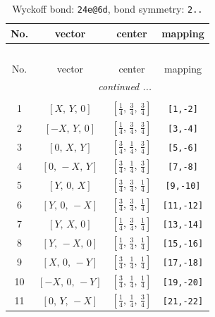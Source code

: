 \documentclass[fleqn,8pt]{jsarticle}
\begin{document}
\begin{longtable}{cccc}
\caption{Wyckoff bond: {\tt 24e@6d}, bond symmetry: {\tt 2..}}
 \\
 \hline \hline
No. & vector & center & mapping \\ \hline \endfirsthead

\multicolumn{3}{l}{\tablename\ \thetable{}} \\
 \hline \hline
No. & vector & center & mapping \\ \hline \endhead

 \hline \hline
\multicolumn{3}{r}{\footnotesize\it continued ...} \\ \endfoot

 \hline \hline
\multicolumn{3}{r}{} \\ \endlastfoot

1 & $\left[ X,\, Y,\, 0 \right]$ & $\left[ \frac{1}{4},\, \frac{3}{4},\, \frac{3}{4} \right]$ & {\tt [1,-2]} \\ \hline
2 & $\left[ - X,\, Y,\, 0 \right]$ & $\left[ \frac{1}{4},\, \frac{3}{4},\, \frac{3}{4} \right]$ & {\tt [3,-4]} \\ \hline
3 & $\left[ 0,\, X,\, Y \right]$ & $\left[ \frac{3}{4},\, \frac{1}{4},\, \frac{3}{4} \right]$ & {\tt [5,-6]} \\ \hline
4 & $\left[ 0,\, - X,\, Y \right]$ & $\left[ \frac{3}{4},\, \frac{1}{4},\, \frac{3}{4} \right]$ & {\tt [7,-8]} \\ \hline
5 & $\left[ Y,\, 0,\, X \right]$ & $\left[ \frac{3}{4},\, \frac{3}{4},\, \frac{1}{4} \right]$ & {\tt [9,-10]} \\ \hline
6 & $\left[ Y,\, 0,\, - X \right]$ & $\left[ \frac{3}{4},\, \frac{3}{4},\, \frac{1}{4} \right]$ & {\tt [11,-12]} \\ \hline
7 & $\left[ Y,\, X,\, 0 \right]$ & $\left[ \frac{1}{4},\, \frac{3}{4},\, \frac{1}{4} \right]$ & {\tt [13,-14]} \\ \hline
8 & $\left[ Y,\, - X,\, 0 \right]$ & $\left[ \frac{1}{4},\, \frac{3}{4},\, \frac{1}{4} \right]$ & {\tt [15,-16]} \\ \hline
9 & $\left[ X,\, 0,\, - Y \right]$ & $\left[ \frac{3}{4},\, \frac{1}{4},\, \frac{1}{4} \right]$ & {\tt [17,-18]} \\ \hline
10 & $\left[ - X,\, 0,\, - Y \right]$ & $\left[ \frac{3}{4},\, \frac{1}{4},\, \frac{1}{4} \right]$ & {\tt [19,-20]} \\ \hline
11 & $\left[ 0,\, Y,\, - X \right]$ & $\left[ \frac{1}{4},\, \frac{1}{4},\, \frac{3}{4} \right]$ & {\tt [21,-22]} \\ \hline

\end{longtable}
\end{document}
